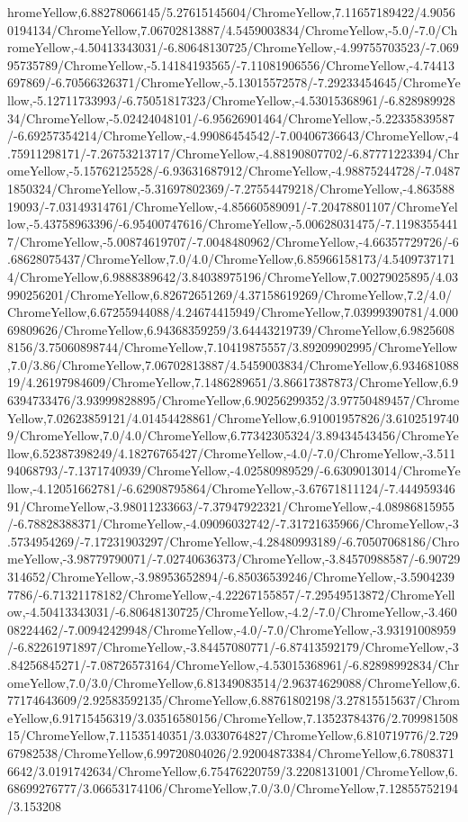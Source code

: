 {\begin{tikzternal}
{hromeYellow,6.88278066145/5.27615145604/ChromeYellow,7.11657189422/4.90560194134/ChromeYellow,7.06702813887/4.5459003834/ChromeYellow,-5.0/-7.0/ChromeYellow,-4.50413343031/-6.80648130725/ChromeYellow,-4.99755703523/-7.06995735789/ChromeYellow,-5.14184193565/-7.11081906556/ChromeYellow,-4.74413697869/-6.70566326371/ChromeYellow,-5.13015572578/-7.29233454645/ChromeYellow,-5.12711733993/-6.75051817323/ChromeYellow,-4.53015368961/-6.82898992834/ChromeYellow,-5.02424048101/-6.95626901464/ChromeYellow,-5.22335839587/-6.69257354214/ChromeYellow,-4.99086454542/-7.00406736643/ChromeYellow,-4.75911298171/-7.26753213717/ChromeYellow,-4.88190807702/-6.87771223394/ChromeYellow,-5.15762125528/-6.93631687912/ChromeYellow,-4.98875244728/-7.04871850324/ChromeYellow,-5.31697802369/-7.27554479218/ChromeYellow,-4.86358819093/-7.03149314761/ChromeYellow,-4.85660589091/-7.20478801107/ChromeYellow,-5.43758963396/-6.95400747616/ChromeYellow,-5.00628031475/-7.11983554417/ChromeYellow,-5.00874619707/-7.0048480962/ChromeYellow,-4.66357729726/-6.68628075437/ChromeYellow,7.0/4.0/ChromeYellow,6.85966158173/4.54097371714/ChromeYellow,6.9888389642/3.84038975196/ChromeYellow,7.00279025895/4.03990256201/ChromeYellow,6.82672651269/4.37158619269/ChromeYellow,7.2/4.0/ChromeYellow,6.67255944088/4.24674415949/ChromeYellow,7.03999390781/4.00069809626/ChromeYellow,6.94368359259/3.64443219739/ChromeYellow,6.98256088156/3.75060898744/ChromeYellow,7.10419875557/3.89209902995/ChromeYellow,7.0/3.86/ChromeYellow,7.06702813887/4.5459003834/ChromeYellow,6.93468108819/4.26197984609/ChromeYellow,7.1486289651/3.86617387873/ChromeYellow,6.96394733476/3.93999828895/ChromeYellow,6.90256299352/3.97750489457/ChromeYellow,7.02623859121/4.01454428861/ChromeYellow,6.91001957826/3.61025197409/ChromeYellow,7.0/4.0/ChromeYellow,6.77342305324/3.89434543456/ChromeYellow,6.52387398249/4.18276765427/ChromeYellow,-4.0/-7.0/ChromeYellow,-3.51194068793/-7.1371740939/ChromeYellow,-4.02580989529/-6.6309013014/ChromeYellow,-4.12051662781/-6.62908795864/ChromeYellow,-3.67671811124/-7.44495934691/ChromeYellow,-3.98011233663/-7.37947922321/ChromeYellow,-4.08986815955/-6.78828388371/ChromeYellow,-4.09096032742/-7.31721635966/ChromeYellow,-3.5734954269/-7.17231903297/ChromeYellow,-4.28480993189/-6.70507068186/ChromeYellow,-3.98779790071/-7.02740636373/ChromeYellow,-3.84570988587/-6.90729314652/ChromeYellow,-3.98953652894/-6.85036539246/ChromeYellow,-3.59042397786/-6.71321178182/ChromeYellow,-4.22267155857/-7.29549513872/ChromeYellow,-4.50413343031/-6.80648130725/ChromeYellow,-4.2/-7.0/ChromeYellow,-3.46008224462/-7.00942429948/ChromeYellow,-4.0/-7.0/ChromeYellow,-3.93191008959/-6.82261971897/ChromeYellow,-3.84457080771/-6.87413592179/ChromeYellow,-3.84256845271/-7.08726573164/ChromeYellow,-4.53015368961/-6.82898992834/ChromeYellow,7.0/3.0/ChromeYellow,6.81349083514/2.96374629088/ChromeYellow,6.77174643609/2.92583592135/ChromeYellow,6.88761802198/3.27815515637/ChromeYellow,6.91715456319/3.03516580156/ChromeYellow,7.13523784376/2.70998150815/ChromeYellow,7.11535140351/3.0330764827/ChromeYellow,6.810719776/2.72967982538/ChromeYellow,6.99720804026/2.92004873384/ChromeYellow,6.78083716642/3.0191742634/ChromeYellow,6.75476220759/3.2208131001/ChromeYellow,6.68699276777/3.06653174106/ChromeYellow,7.0/3.0/ChromeYellow,7.12855752194/3.153208}
\end{tikzternal}}
